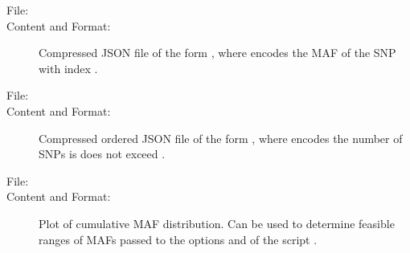 \documentclass[a4paper,10pt,english]{sphinxhowto}
\begin{document}
\begin{description}
\begin{description}
\begin{description}
\end{description}

\item[{\sphinxstyleemphasis{MAFs:}}] \leavevmode\begin{description}
\item[{File:}] \leavevmode
{}

\item[{Content and Format:}] \leavevmode
Compressed JSON file of the form , where  encodes the MAF of
the SNP with index .

\end{description}

\item[{\sphinxstyleemphasis{Cumulative MAF distribution:}}] \leavevmode\begin{description}
\item[{File:}] \leavevmode
{}

\item[{Content and Format:}] \leavevmode
Compressed ordered JSON file of the form , where  encodes the
number of SNPs is does not exceed .

\end{description}

\item[{\sphinxstyleemphasis{Plot of Cumulative MAF distribution:}}] \leavevmode\begin{description}
\item[{File:}] \leavevmode
{}

\item[{Content and Format:}] \leavevmode
Plot of cumulative MAF distribution. Can be used to determine feasible ranges of MAFs passed to the options
 and  of the script .

\end{description}

\end{description}

\end{description}
\end{document}
